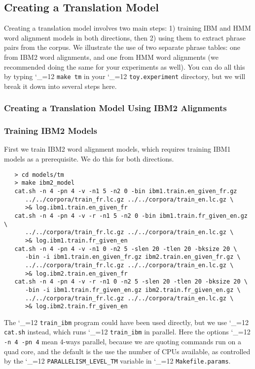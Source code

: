 \documentclass[11pt,letterpaper]{article}
\def\code{\begingroup\catcode`\_=12 \codex}
\newcommand{\codex}[1]{\texttt{#1}\endgroup}
\begin{document}
\subsection{Creating a Translation Model} \label{TM}

Creating a translation model involves two main steps: 1) training IBM and HMM word
alignment models in both directions, then 2) using them to extract phrase pairs
from the corpus.  We illustrate the use of two separate phrase tables: one
from IBM2 word alignments, and one from HMM word alignments (we recommended
doing the same for your experiments as well).  You can do all this by typing
\code{make tm} in your \code{toy.experiment} directory, but we will break
it down into several steps here.

\subsubsection{Creating a Translation Model Using IBM2 Alignments} \label{IBM2}

\subsubsection*{Training IBM2 Models}

First we train IBM2 word alignment models, which requires training IBM1 models
as a prerequisite.  We do this for both directions.
\begin{small}
\begin{verbatim}
   > cd models/tm
   > make ibm2_model
   cat.sh -n 4 -pn 4 -v -n1 5 -n2 0 -bin ibm1.train.en_given_fr.gz 
      ../../corpora/train_fr.lc.gz ../../corpora/train_en.lc.gz \
      >& log.ibm1.train.en_given_fr
   cat.sh -n 4 -pn 4 -v -r -n1 5 -n2 0 -bin ibm1.train.fr_given_en.gz \
      ../../corpora/train_fr.lc.gz ../../corpora/train_en.lc.gz \
      >& log.ibm1.train.fr_given_en
   cat.sh -n 4 -pn 4 -v -n1 0 -n2 5 -slen 20 -tlen 20 -bksize 20 \
      -bin -i ibm1.train.en_given_fr.gz ibm2.train.en_given_fr.gz \
      ../../corpora/train_fr.lc.gz ../../corpora/train_en.lc.gz \
      >& log.ibm2.train.en_given_fr
   cat.sh -n 4 -pn 4 -v -r -n1 0 -n2 5 -slen 20 -tlen 20 -bksize 20 \
      -bin -i ibm1.train.fr_given_en.gz ibm2.train.fr_given_en.gz \
      ../../corpora/train_fr.lc.gz ../../corpora/train_en.lc.gz \
      >& log.ibm2.train.fr_given_en
\end{verbatim}
\end{small}
The \code{train_ibm} program could have been used directly, but we use
\code{cat.sh} instead, which runs \code{train_ibm} in parallel. Here
the options \code{-n 4 -pn 4} mean 4-ways parallel, because we are quoting
commands run on a quad core, and the default is the use the number of CPUs
available, as controlled by the \code{PARALLELISM_LEVEL_TM} variable in
\code{Makefile.params}.
\end{document}
